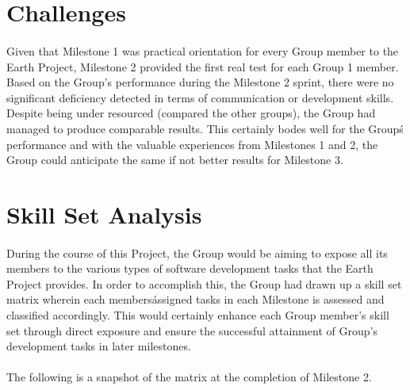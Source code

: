 \documentclass[oneside, 10pt, a4]{article}
\begin{document}
\section{Challenges}

\paragraph{}
Given that Milestone 1 was practical orientation for every Group member to the Earth Project, 
Milestone 2 provided the first real test for each Group 1 member. Based on the Group's performance 
during the Milestone 2 sprint, there were no significant deficiency detected in terms of 
communication or development skills. Despite being under resourced (compared the other groups), 
the Group had managed to produce comparable results. This certainly bodes well for the Group\'s 
performance and with the valuable experiences from Milestones 1 and 2, the Group could anticipate the 
same if not better results for Milestone 3.

\newpage

\section{Skill Set Analysis}

\paragraph{}
During the course of this Project, the Group would be aiming to expose all its members 
to the various types of software development tasks that the Earth Project provides. 
In order to accomplish this, the Group had drawn up a skill set matrix wherein each members\' 
assigned tasks in each Milestone is assessed and classified accordingly. This would certainly 
enhance each Group member's skill set through direct exposure and ensure the successful 
attainment of Group's development tasks in later milestones.

\paragraph{}
The following is a snapshot of the matrix at the completion of Milestone 2.
\end{document}
